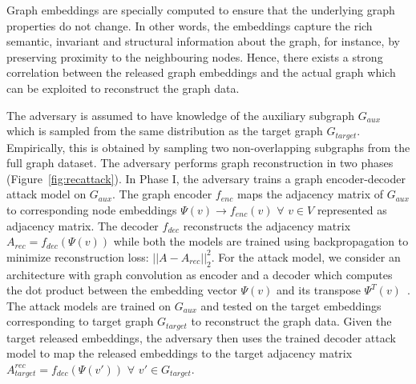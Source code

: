Graph embeddings are specially computed to ensure that the underlying graph properties do not change.
In other words, the embeddings capture the rich semantic, invariant and structural information about the graph, for instance, by preserving proximity to the neighbouring nodes.
Hence, there exists a strong correlation between the released graph embeddings and the actual graph which can be exploited to reconstruct the graph data.




The adversary is assumed to have knowledge of the auxiliary subgraph $G_{aux}$ which is sampled from the same distribution as the target graph $G_{target}$.
Empirically, this is obtained by sampling two non-overlapping subgraphs from the full graph dataset.
The adversary performs graph reconstruction in two phases (Figure~\ref{fig:recattack}).
In Phase I, the adversary trains a graph encoder-decoder attack model on $G_{aux}$.
The graph encoder $f_{enc}$ maps the adjacency matrix of $G_{aux}$ to corresponding node embeddings $\Psi (v)\rightarrow f_{enc}(v)$ $\forall$ $v \in V$ represented as adjacency matrix.
The decoder $f_{dec}$ reconstructs the adjacency matrix $A_{rec} = f_{dec}(\Psi (v))$ while both the models are trained using backpropagation to minimize reconstruction loss: $||A - A_{rec}||_2^2$.
For the attack model, we consider an architecture with graph convolution as encoder and a decoder which computes the dot product between the embedding vector $\Psi (v)$ and its transpose $\Psi^T (v)$~\cite{Kipf2016tc}.
The attack models are trained on $G_{aux}$ and tested on the target embeddings corresponding to target graph $G_{target}$ to reconstruct the graph data.
Given the target released embeddings, the adversary then uses the trained decoder attack model to map the released embeddings to the target adjacency matrix $A_{target}^{rec} = f_{dec}(\Psi (v'))$ $\forall$ $v'\in G_{target}$.\\




